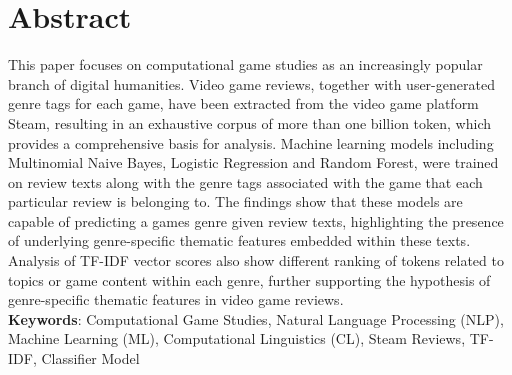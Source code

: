 \documentclass[11pt, a4paper]{article}
\begin{document}
\thispagestyle{empty}\clearpage

\section*{Abstract}
This paper focuses on computational game studies as an increasingly popular branch of digital humanities.
Video game reviews, together with user-generated genre tags for each game, have been extracted from the video game
platform Steam, resulting in an exhaustive corpus of more than one billion token, which provides a comprehensive
basis for analysis.
Machine learning models including Multinomial Naive Bayes, Logistic Regression and Random Forest, were trained on review texts
along with the genre tags associated with the game that each particular review is belonging to.
The findings show that these models are capable of predicting a games genre given review texts, highlighting the
presence of underlying genre-specific thematic features embedded within these texts.
Analysis of TF-IDF vector scores also show different ranking of tokens related to topics or game content within each
genre, further supporting the hypothesis of genre-specific thematic features in video game reviews.\\

\noindent\textbf{Keywords}: Computational Game Studies, Natural Language Processing (NLP), Machine Learning (ML),
Computational Linguistics (CL), Steam Reviews, TF-IDF, Classifier Model
\clearpage


\clearpage
\tableofcontents\vspace{2\baselineskip}%
\listoftables\vspace{2\baselineskip}%
\listoffigures\clearpage
\end{document}
